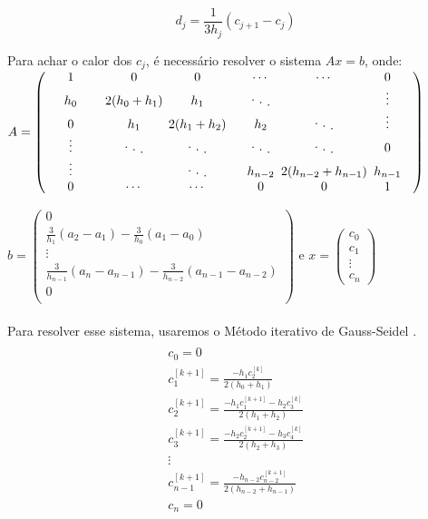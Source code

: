 \documentclass[a4paper,10pt]{article}
\newcommand{\diagentry}[1]{\mathmakebox[4em]{#1}}
\newcommand{\xddots}{%
 \raise 3pt \hbox {.}
  \mkern 6mu
  \raise 1pt \hbox {.}
  \mkern 6mu
  \raise -1pt \hbox {.}
}
\begin{document}
  \begin{equation}
   d_j = \frac{1}{3h_j}(c_{j+1}-c_j)
  \label{eq:coef_d}
  \end{equation}

  Para achar o calor dos $c_j$, é necessário resolver o sistema $Ax=b$, onde: 
$
A = \begin{pmatrix}
\diagentry{1} & \diagentry{0}&0&\cdots&\cdots&0\\
\diagentry{h_0} & \diagentry{2(h_0+h_1)} & \diagentry{h_1}&\diagentry{\xddots}&&\vdots\\
0 &\diagentry {h_1} & \diagentry{2(h_1+h_2)} & \diagentry{h_2}&\diagentry{\xddots}&\vdots\\
\vdots & \diagentry{\xddots} & \diagentry{\xddots} & \diagentry{\xddots} & \diagentry{\xddots}&0\\
\vdots && \diagentry{\xddots} & \diagentry {h_{n-2}} & \diagentry{2(h_{n-2}+h_{n-1})} & \diagentry{h_{n-1}}\\
0 &\cdots&\cdots&0& 0 & 1\\


\end{pmatrix}
$

$
b = \begin{pmatrix}
0\\
\frac{3}{h_1}(a_2-a_1)-\frac{3}{h_0}(a_1-a_0)\\
\vdots\\
\frac{3}{h_{n-1}}(a_n-a_{n-1})-\frac{3}{h_{n-2}}(a_{n-1}-a_{n-2})\\
0\\
\end{pmatrix}
$
e
$
x = \begin{pmatrix}
c_0\\
c_1\\
\vdots\\
c_n
\end{pmatrix}
$
\\ \\
Para resolver esse sistema, usaremos o Método iterativo de Gauss-Seidel \cite{humes}. 
  \begin{multline}
\\ c_0 = 0 \\
c_1^{[k+1]} = \frac{-h_1c_2^{[k]}}{2(h_0+h_1)} \\
c_2^{[k+1]} = \frac{-h_1c_1^{[k+1]}-h_2c_3^{[k]}}{2(h_1+h_2)} \\
c_3^{[k+1]} = \frac{-h_2c_2^{[k+1]}-h_3c_4^{[k]}}{2(h_2+h_3)} \\
\vdots \\
c_{n-1}^{[k+1]} = \frac{-h_{n-2}c_{n-2}^{[k+1]}}{2(h_{n-2}+h_{n-1})} \\
c_n = 0 \\
  \end{multline}
  
\end{document}
